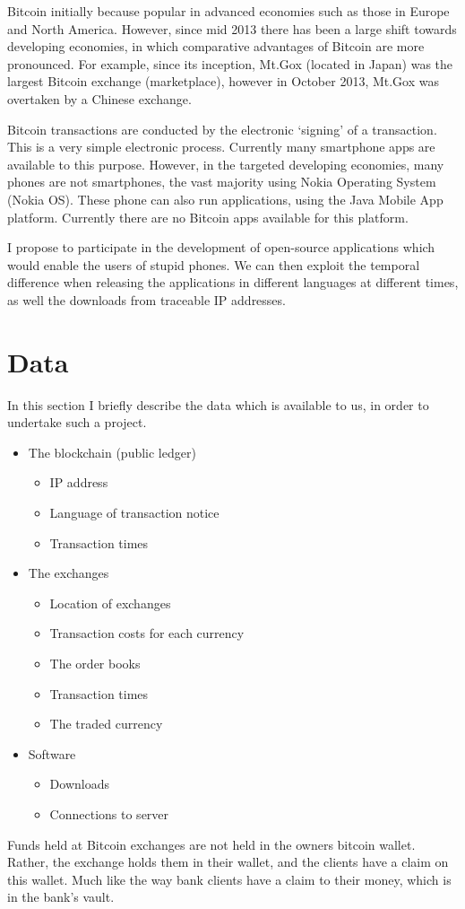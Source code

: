 \begin{refsection}
Bitcoin initially because popular in advanced economies such as those in Europe and North America.
However, since mid 2013 there has been a large shift towards developing economies,
in which comparative advantages of Bitcoin are more pronounced.
For example, since its inception, Mt.Gox (located in Japan) was the largest Bitcoin exchange (marketplace), however in October 2013, Mt.Gox was overtaken by a Chinese exchange.

Bitcoin transactions are conducted by the electronic `signing' of a transaction.
This is a very simple electronic process.
Currently many smartphone apps are available to this purpose.
However, in the targeted developing economies, many phones are not smartphones, the vast majority using Nokia Operating System (Nokia OS).
 These phone can also run applications, using the Java Mobile App platform. Currently there are no Bitcoin apps available for this platform.

I propose to participate in the development of open-source applications which would enable the users of stupid phones.
We can then exploit the temporal difference when releasing the applications in different languages at different times,
as well the downloads from traceable IP addresses.

\section{Data}
In this section I briefly describe the data which is available to us, in order to undertake such a project.
\label{btc:data}
\begin{itemize}
 \item The blockchain (public ledger)
 \begin{itemize}
 	\item IP address
 	\item Language of transaction notice
 	\item Transaction times
 \end{itemize}
 \item The exchanges
 \begin{itemize}
 	\item Location of exchanges
 	\item Transaction costs for each currency
	\item The order books
	\item Transaction times
 	\item The traded currency
 \end{itemize}
 \item Software
 \begin{itemize}
 	\item Downloads
 	\item Connections to server
 \end{itemize}
\end{itemize}
Funds held at Bitcoin exchanges are not held in the owners bitcoin wallet.
Rather, the exchange holds them in their wallet, and the clients have a claim on this wallet.
Much like the way bank clients have a claim to their money, which is in the bank's vault.


\end{refsection}
